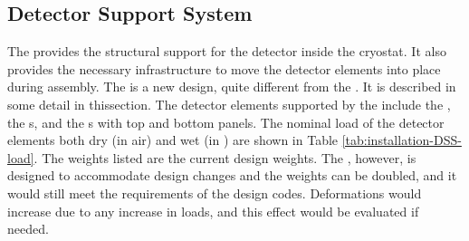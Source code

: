 \subsection{Detector Support System}
\label{sec:fdsp-tc-infr-dss}

The  provides the structural support for the detector inside the cryostat.  
It also provides the necessary infrastructure to move the detector elements into place during
assembly. The  is a new design, quite different from the  . It is described in some detail in thissection. The detector elements supported by the  include the , the s, and the s with top and bottom  panels. The nominal load of the detector elements both dry (in air) and wet (in ) are shown in Table \ref{tab:installation-DSS-load}. The weights listed are the current design weights.  The , however, is designed to accommodate design changes and the weights can be doubled, and it would still meet the requirements of the design codes.  Deformations would increase due to any increase in loads, and this effect would be evaluated if needed.

